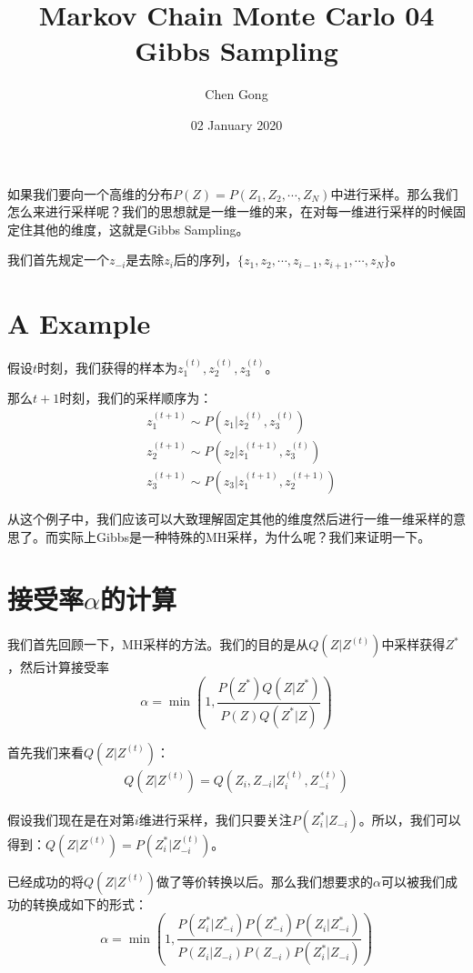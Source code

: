 \documentclass[a4paper]{article}
\title{Markov Chain Monte Carlo 04 Gibbs Sampling}
\author{Chen Gong}
\date{02 January 2020}
\begin{document}
\maketitle
如果我们要向一个高维的分布$P(Z) = P(Z_1,Z_2,\cdots,Z_N)$中进行采样。那么我们怎么来进行采样呢？我们的思想就是一维一维的来，在对每一维进行采样的时候固定住其他的维度，这就是Gibbs Sampling。

我们首先规定一个$z_{-i}$是去除$z_i$后的序列，$\{ z_1,z_2,\cdots,z_{i-1},z_{i+1},\cdots,z_N \}$。
\section{A Example}
假设$t$时刻，我们获得的样本为$z_1^{(t)},z_2^{(t)},z_3^{(t)}$。

那么$t+1$时刻，我们的采样顺序为：
\begin{equation}
    \begin{split}
        & z_1^{(t+1)} \sim P(z_1|z_2^{(t)},z_3^{(t)}) \\
        & z_2^{(t+1)} \sim P(z_2|z_1^{(t+1)},z_3^{(t)}) \\ 
        & z_3^{(t+1)} \sim P(z_3|z_1^{(t+1)},z_2^{(t+1)})
    \end{split}
\end{equation}

从这个例子中，我们应该可以大致理解固定其他的维度然后进行一维一维采样的意思了。而实际上Gibbs是一种特殊的MH采样，为什么呢？我们来证明一下。

\section{接受率$\alpha$的计算}
我们首先回顾一下，MH采样的方法。我们的目的是从$Q(Z|Z^{(t)})$中采样获得$Z^\ast$，然后计算接受率
\begin{equation}
    \alpha = \min \left( 1, \frac{P(Z^\ast)Q(Z|Z^\ast)}{P(Z)Q(Z^\ast|Z)}  \right)
\end{equation}

首先我们来看$Q(Z|Z^{(t)})$：
\begin{equation}
    \begin{split}
        Q(Z|Z^{(t)}) = Q(Z_i,Z_{-i}|Z^{(t)}_i,Z^{(t)}_{-i})
    \end{split}
\end{equation}

假设我们现在是在对第$i$维进行采样，我们只要关注$P(Z_i^\ast | Z_{-i})$。所以，我们可以得到：$Q(Z|Z^{(t)}) = P(Z_i^\ast | Z_{-i}^{(t)})$。

已经成功的将$Q(Z|Z^{(t)})$做了等价转换以后。那么我们想要求的$\alpha$可以被我们成功的转换成如下的形式：
\begin{equation}
    \alpha = \min \left( 1, \frac{P(Z^\ast_{i}|Z^\ast_{-i})P(Z^\ast_{-i})P(Z_i|Z^\ast_{-i})}{P(Z_i|Z_{-i})P(Z_{-i})P(Z^\ast_i|Z_{-i})} \right)
\end{equation}
\end{document}
